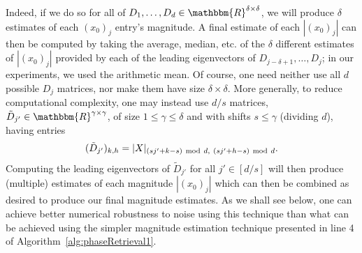 Indeed, if we do so for all of $D_1, \dots, D_d \in \mathbbm{R}^{\delta \times \delta}$, we will produce $\delta$ estimates of each $(x_0)_{j}$ entry's magnitude.  A final estimate of each $|(x_0)_j|$ can then be computed by taking the average, median, etc. of the $\delta$ different estimates of $|(x_0)_j|$ provided by each of the leading eigenvectors of $D_{j-\delta+1}, \dots, D_j$; in our experiments, we used the arithmetic mean.  Of course, one need neither use all $d$ possible $D_j$ matrices, nor make them have size $\delta \times \delta$.  More generally, to reduce computational complexity, one may instead use $d/s$ matrices, $\tilde{D}_{j'} \in \mathbbm{R}^{\gamma \times \gamma}$, of size $1 \leq \gamma \leq \delta$ and with shifts $s \leq \gamma$ (dividing $d$), having entries
$$(\tilde{D}_{j'})_{k,h} = |X|_{(sj'+k-s)~{\rm mod}~d,~(sj'+h-s)~{\rm mod}~d}.$$
Computing the leading eigenvectors of $\tilde{D}_{j'}$ for all $j' \in [d/s]$ will then produce (multiple) estimates of each magnitude $|(x_0)_j|$ which can then be combined as desired to produce our final magnitude estimates.  As we shall see below, one can achieve better numerical robustness to noise using this technique than what can be achieved using the simpler magnitude estimation technique presented in line 4 of Algorithm~\ref{alg:phaseRetrieval1}.

